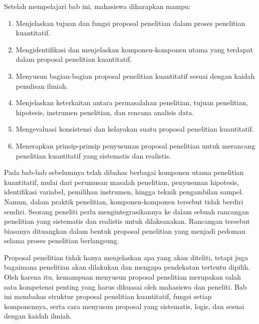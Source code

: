 \documentclass[
  indonesian,
  letterpaper,
  DIV=11,
  numbers=noendperiod]{scrreprt}
\providecommand{\tightlist}{%
  \setlength{\itemsep}{0pt}\setlength{\parskip}{0pt}}
\begin{document}
\begin{tcolorbox}[enhanced jigsaw, colframe=quarto-callout-note-color-frame, toptitle=1mm, breakable, leftrule=.75mm, arc=.35mm, toprule=.15mm, colback=white, colbacktitle=quarto-callout-note-color!10!white, bottomtitle=1mm, bottomrule=.15mm, titlerule=0mm, title=\textcolor{quarto-callout-note-color}{\faInfo}\hspace{0.5em}{Capaian Pembelajaran}, coltitle=black, left=2mm, opacitybacktitle=0.6, opacityback=0, rightrule=.15mm]

Setelah mempelajari bab ini, mahasiswa diharapkan mampu:

\begin{enumerate}
\def\labelenumi{\arabic{enumi}.}
\tightlist
\item
  Menjelaskan tujuan dan fungsi proposal penelitian dalam proses
  penelitian kuantitatif.
\item
  Mengidentifikasi dan menjelaskan komponen-komponen utama yang terdapat
  dalam proposal penelitian kuantitatif.
\item
  Menyusun bagian-bagian proposal penelitian kuantitatif sesuai dengan
  kaidah penulisan ilmiah.
\item
  Menjelaskan keterkaitan antara permasalahan penelitian, tujuan
  penelitian, hipotesis, instrumen penelitian, dan rencana analisis
  data.
\item
  Mengevaluasi konsistensi dan kelayakan suatu proposal penelitian
  kuantitatif.
\item
  Menerapkan prinsip-prinsip penyusunan proposal penelitian untuk
  merancang penelitian kuantitatif yang sistematis dan realistis.
\end{enumerate}

\end{tcolorbox}

Pada bab-bab sebelumnya telah dibahas berbagai komponen utama penelitian
kuantitatif, mulai dari perumusan masalah penelitian, penyusunan
hipotesis, identifikasi variabel, pemilihan instrumen, hingga teknik
pengambilan sampel. Namun, dalam praktik penelitian, komponen-komponen
tersebut tidak berdiri sendiri. Seorang peneliti perlu
mengintegrasikannya ke dalam sebuah rancangan penelitian yang sistematis
dan realistis untuk dilaksanakan. Rancangan tersebut biasanya dituangkan
dalam bentuk proposal penelitian yang menjadi pedoman selama proses
penelitian berlangsung.

Proposal penelitian tidak hanya menjelaskan apa yang akan diteliti,
tetapi juga bagaimana penelitian akan dilakukan dan mengapa pendekatan
tertentu dipilih. Oleh karena itu, kemampuan menyusun proposal
penelitian merupakan salah satu kompetensi penting yang harus dikuasai
oleh mahasiswa dan peneliti. Bab ini membahas struktur proposal
penelitian kuantitatif, fungsi setiap komponennya, serta cara menyusun
proposal yang sistematis, logis, dan sesuai dengan kaidah ilmiah.
\end{document}
